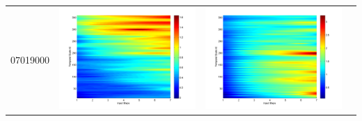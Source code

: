 \documentclass[11pt]{article}
\begin{document}
\begin{table}[H]
{\begin{tabular}{cccc}
07019000&\begin{minipage}{.3\textwidth}\includegraphics[width=\linewidth]{resultgraph/07019000p.png}\end{minipage}
&\begin{minipage}{.3\textwidth}\includegraphics[width=\linewidth]{resultgraph/07019000pep.png}\end{minipage}

\end{tabular}}
\end{table}
\end{document}
